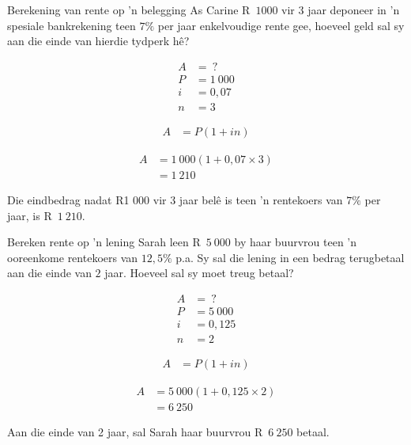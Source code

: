 \begin{wex}{Berekening van rente op 'n belegging}
{As Carine R~$1 000$ vir 3 jaar deponeer
in ’n spesiale bankrekening teen $7\%$ per jaar enkelvoudige rente gee,
hoeveel geld sal sy aan die einde van hierdie tydperk hê?}
{

    \begin{align*}
	A &= ~?\\
	P &= 1~000\\
	i &= 0,07\\
	n &= 3
    \end{align*}
    
    \begin{align*}
	A &= P(1 + in)
    \end{align*}

    \begin{align*}
	A &= 1~000(1 + 0,07 \times 3)\\
	  &= 1~210
    \end{align*}

    Die eindbedrag nadat R1 000 vir 3 jaar belê is teen ’n rentekoers
van $7\%$ per jaar, is R~$1~210$.
    }
\end{wex}


\begin{wex}{Bereken rente op 'n lening}{
    Sarah leen R~$5~000$ by haar buurvrou teen 'n ooreenkome rentekoers van $12,5\%$ p.a. Sy sal die lening in een bedrag terugbetaal aan die einde van $2$ jaar. Hoeveel sal sy moet treug betaal?}{

    \begin{align*}
	A &= ~?\\
	P &= 5~000\\
	i &= 0,125\\
	n &= 2
    \end{align*}

    \begin{align*}
	A &= P(1 + in)
    \end{align*}

    \begin{align*}
	A &= 5~000(1 + 0,125 \times 2)\\
	  &= 6~250
    \end{align*}

    Aan die einde van 2 jaar, sal Sarah haar buurvrou R~$6~250$ betaal.
    }
\end{wex}


